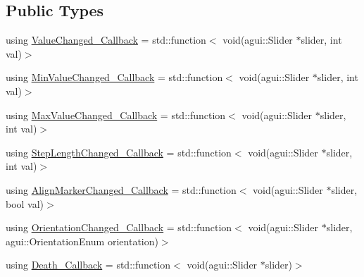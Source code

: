 \subsection*{Public Types}
\begin{DoxyCompactItemize}
\item 
using \mbox{\hyperlink{classec_1_1_generic_slider_listener_ab4562c9d0ca6599598d872bf6fb45cfb}{Value\+Changed\+\_\+\+Callback}} = std\+::function$<$ void(agui\+::\+Slider $\ast$slider, int val)$>$
\item 
using \mbox{\hyperlink{classec_1_1_generic_slider_listener_a16d9612be31a0bbb0cc931c87ca43503}{Min\+Value\+Changed\+\_\+\+Callback}} = std\+::function$<$ void(agui\+::\+Slider $\ast$slider, int val)$>$
\item 
using \mbox{\hyperlink{classec_1_1_generic_slider_listener_a73ad440b637c2ce8b6f094702d9c3cf3}{Max\+Value\+Changed\+\_\+\+Callback}} = std\+::function$<$ void(agui\+::\+Slider $\ast$slider, int val)$>$
\item 
using \mbox{\hyperlink{classec_1_1_generic_slider_listener_afde2dc39404d84bb597b9cc4be265814}{Step\+Length\+Changed\+\_\+\+Callback}} = std\+::function$<$ void(agui\+::\+Slider $\ast$slider, int val)$>$
\item 
using \mbox{\hyperlink{classec_1_1_generic_slider_listener_a0b14e921e56b7dfc0a23af21f9921e0c}{Align\+Marker\+Changed\+\_\+\+Callback}} = std\+::function$<$ void(agui\+::\+Slider $\ast$slider, bool val)$>$
\item 
using \mbox{\hyperlink{classec_1_1_generic_slider_listener_af0bd5763136a162c785fc2e37be42fed}{Orientation\+Changed\+\_\+\+Callback}} = std\+::function$<$ void(agui\+::\+Slider $\ast$slider, agui\+::\+Orientation\+Enum orientation)$>$
\item 
using \mbox{\hyperlink{classec_1_1_generic_slider_listener_a73457456f87df632db463dbab48980ad}{Death\+\_\+\+Callback}} = std\+::function$<$ void(agui\+::\+Slider $\ast$slider)$>$
\end{DoxyCompactItemize}
